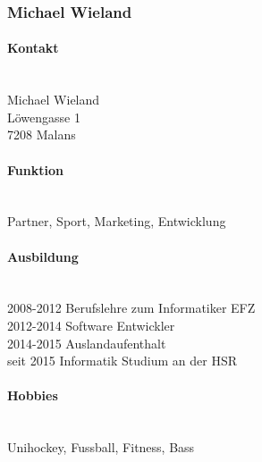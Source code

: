 \subsubsection{Michael Wieland}
\noindent\begin{minipage}{0.7\textwidth}
	\paragraph{Kontakt} \hfill \\
	Michael Wieland \\
	Löwengasse 1 \\
	7208 Malans \\
	
	\paragraph{Funktion} \hfill \\
	Partner, Sport, Marketing, Entwicklung \\
	
	\paragraph{Ausbildung} \hfill \\
	2008-2012 \hspace{1cm} Berufslehre zum Informatiker EFZ \\
	2012-2014 \hspace{1cm} Software Entwickler \\
	2014-2015 \hspace{1cm} Auslandaufenthalt \\
	seit 2015 \hspace{1.25cm} Informatik Studium an der HSR \\
	
	\paragraph{Hobbies} \hfill \\
	Unihockey, Fussball, Fitness, Bass
\end{minipage}
\hfill
